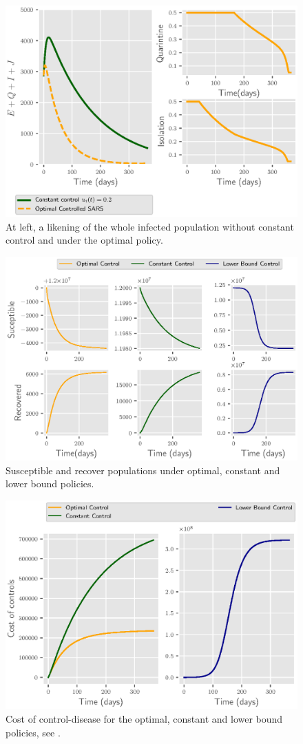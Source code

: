 \begin{figure}[H]
  \centering
  \includegraphics{Figures/figure_1_sars}
  \caption{At left, a likening of the whole infected population
  without constant control and under the optimal policy. }
  \label{fig:figure1sars}
\end{figure}

\begin{figure}[H]
  \centering
  \includegraphics{Figures/figure_2_sars}
  \caption{Susceptible and recover populations under
  optimal, constant and lower bound policies.}
  \label{fig:figure2sars}
\end{figure}

\begin{figure}[H]
  \centering
  \includegraphics{Figures/figure_3_sars}
  \caption{
    Cost of control-disease for the optimal, constant and lower bound
    policies, see .
  }
  \label{fig:figure3sars}
\end{figure}